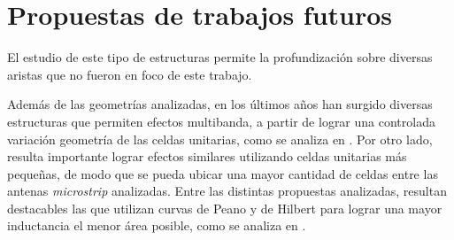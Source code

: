 

\section{Propuestas de trabajos futuros}

El estudio de este tipo de estructuras permite la profundización sobre diversas aristas que no fueron en foco de este trabajo.

Además de las geometrías analizadas, en los últimos años han surgido diversas estructuras que permiten efectos multibanda, a partir de lograr una controlada variación geometría de las celdas unitarias, como se analiza en \cite{Kern:multiband}. Por otro lado, resulta importante lograr efectos similares utilizando celdas unitarias más pequeñas, de modo que se pueda ubicar una mayor cantidad de celdas entre las antenas \textit{microstrip} analizadas. Entre las distintas propuestas analizadas, resultan destacables las que utilizan curvas de Peano y de Hilbert para lograr una mayor inductancia el menor área posible, como se analiza en \cite{McVay:Hilbert}.

